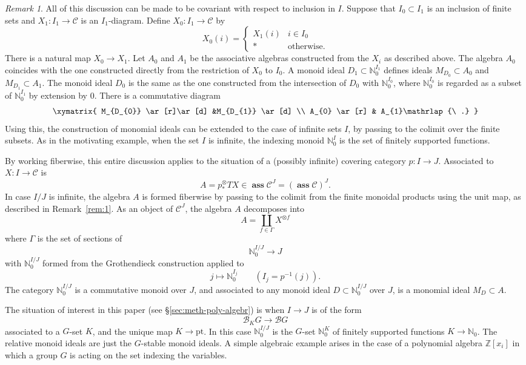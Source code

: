 \documentclass{amsart}
\newtheorem{rem}[equation]{Remark}
\theoremstyle{definition}
\theoremstyle{remark}
\newtheorem{rem}[equation]{Remark}
\newcommand{\Z}{{\mathbb Z}}
\newcommand{\cat}[1]{{\mathcal #1}}
\DeclareMathOperator{\ass}{\mathbf{ass}}
\newcommand{\asscat}[1]{\ass\cat #1}
\newcommand{\tensorp}[1]{#1^{\otimes}_{\ast}}
\newcommand{\nat}{\mathbb N_{0}}
\begin{document}
\begin{rem}
\label{rem:31} 
All of this discussion can be made to be covariant with
respect to inclusion in $I$.  Suppose that $I_{0}\subset I_{1}$ is an
inclusion of finite sets and $X_{1}:I_{1}\to \cat C$ is an
$I_{1}$-diagram.  Define $X_{0}:I_{1}\to \cat C$ by 
\[
X_{0}(i)= 
\begin{cases}
X_{1}(i) & i\in I_{0} \\
\ast &\text{otherwise}.
\end{cases}
\]
There is a natural map $X_{0}\to X_{1}$.  Let $A_{0}$ and $A_{1}$ be
the associative algebras constructed from the $X_{i}$ as described
above.  The algebra $A_{0}$ coincides with the one constructed
directly from the restriction of $X_{0}$ to $I_{0}$.  A monoid ideal
$D_{1}\subset\nat^{I_{1}}$ defines ideals $M_{D_{0}}\subset A_{0}$ and
$M_{D_{1}}\subset A_{1}$.  The monoid ideal $D_{0}$ is the same as
the one constructed from the intersection of $D_{0}$ with
$\nat^{I_{0}}$, where $\nat^{I_{0}}$ is regarded as a subset of
$\nat^{I_{1}}$ by extension by $0$.  There is a commutative diagram
\[
\xymatrix{
M_{D_{0}}  \ar[r]\ar[d] &M_{D_{1}}   \ar[d] \\
A_{0} \ar[r] & A_{1}\mathrlap{\ .} 
}
\]
Using this, the construction of monomial ideals can be extended to
the case of infinite sets $I$, by passing to the colimit over the
finite subsets.  As in the motivating example, when the set $I$ is
infinite, the indexing monoid $\nat^{I}$ is the set of finitely
supported functions.
\end{rem}

By working fiberwise, this entire discussion applies to the situation
of a (possibly infinite) covering category $p:I\to J$.  Associated to
$X:I\to \cat C$ is 
\[
A=\tensorp{p}TX\in
\asscat{C^{J}}=(\asscat{C})^{J}.
\]
In case $I/J$ is infinite, the algebra $A$ is formed fiberwise by
passing to the colimit from the finite monoidal products using the
unit map, as described in Remark~\ref{rem:1}.  As an object of
$\cat{C}^{J}$, the algebra $A$ decomposes into
\[
A=\coprod_{f\in\Gamma} X^{\otimes f}
\]
where $\Gamma$ is the set of sections of 
\[
\nat^{I/J}\to J
\]
with $\nat^{I/J}$ formed from the Grothendieck construction applied to 
\[
j\mapsto \nat^{I_{j}}\qquad (I_{j}= p^{-1}(j)).
\]
The category $\nat^{I/J}$  is a commutative monoid over $J$, and
associated to any monoid ideal $D\subset \nat^{I/J}$ over $J$, is a
monomial ideal $M_{D}\subset A$.    

The situation of interest in this paper (see \S\ref{sec:meth-poly-algebr})
is when $I\to J$ is of the form 
\[
\cat{B}_{K}G\to \cat{B}G
\]
associated to a $G$-set $K$, and the unique map $K\to\text{pt}$.  In
this case $\nat^{I/J}$ is the $G$-set $\nat^{K}$ of finitely supported
functions $K\to\nat$.  The relative monoid ideals are just the
$G$-stable monoid ideals.  A simple algebraic example arises in the
case of a polynomial algebra $\Z[x_{i}]$ in which a group $G$ is
acting on the set indexing the variables.
\end{document}
